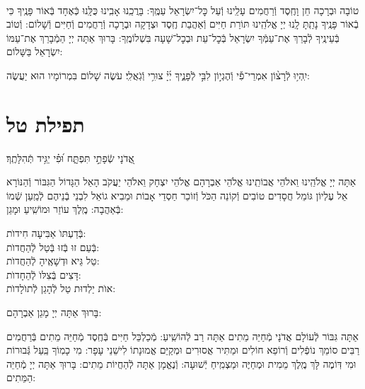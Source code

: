 \documentclass[twoside, openany, parskip=half, 11pt]{book}
\begin{document}
\begin{sometimes}
\shatz\\
 טוֹבָה וּבְרָכָה חֵן וָחֶֽסֶד וְֿרַחֲמִים עָלֵֽינוּ וְֿעַל כׇּל־יִשְׂרָאֵל עַמֶּֽךָ: בָּרֲכֵֽנוּ אָבִֽינוּ כֻּלָּֽנוּ כְּֿאֶחָד בְּֿאוֹר פָּנֶֽיךָ כִּי בְֿאוֹר פָּנֶֽיךָ נָתַֽתָּ לָֽנוּ יְיָ אֱלֹהֵֽינוּ תּוֹרַת חַיִּים וְֿאַהֲבַת חֶֽסֶד וּצְדָקָה וּבְרָכָה וְֿרַחֲמִים וְֿחַיִּים וְֿשָׁלוֹם: וְֿטוֹב בְּֿעֵינֶֽיךָ לְֿבָרֵךְ אֶת־עַמְּֿךָ יִשְׂרָאֵל בְּֿכׇל־עֵת וּבְכׇל־שָׁעָה בִּשְׁלוֹמֶֽךָ: בָּרוּךְ אַתָּה יְיָ הַמְֿבָרֵךְ אֶת־עַמּוֹ יִשְׂרָאֵל בַּשָּׁלוֹם:

 יִֽהְי֥וּ לְֿרָצ֨וֹן אִמְרֵי־פִ֡י וְֿהֶגְי֣וֹן לִבִּ֣י לְֿפָנֶ֑יךָ יְ֜יָ֗ צוּרִ֥י וְֿגֹֽאֲלִֽי׃ עֹשֶׂה שָׁלוֹם בִּמְרוֹמָיו הוּא יַעֲשֶׂה:

 \vfill


 \sepline

 \clearpage

\section[תפילת טל]{ תפילת טל }
\label{tefilastal}


 \begin{small}
אֲ֭דֹנָי שְֿׂפָתַ֣י תִּפְתָּ֑ח וּ֝פִ֗י יַגִּ֥יד תְּֿהִלָּתֶֽךָ׃
\\
\end{small}
 אַתָּה יְיָ אֱלֹהֵֽינוּ וֵאלֹהֵי אֲבוֹתֵֽינוּ אֱלֹהֵי אַבְרָהָם אֱלֹהֵי יִצְחָק וֵאלֹהֵי יַעֲקֹב הָאֵל הַגָּדוֹל הַגִּבּוֹר וְֿהַנּוֹרָא אֵל עֶלְיוֹן גּוֹמֵל חֲסָדִים טוֹבִים וְֿקוֹנֵה הַכֹּל וְֿזוֹכֵר חַסְדֵי אָבוֹת וּמֵבִיא גוֹאֵל לִבְנֵי בְֿנֵיהֶם לְֿמַֽעַן שְֿׁמוֹ בְּֿאַהֲבָה: מֶֽלֶךְ עוֹזֵר וּמוֹשִֽׁיעַ וּמָגֵן:


\begin{large}
 בְּֿדַעְתּוׂ אַבִּיעָה חִידוׂת: \\
בְּֿעַם זוּ בְּֿזוּ בְּֿטַל לְֿהַחֲדוׂת:\\
טַל גֵּיא וּדְשָׁאֶֽיהָ לְֿהַחֲדוׂת: \\
דָּצִים בְּֿצִלּוׂ לְֿהֵחָדוׂת:\\
אוׂת יַלְדוּת טַל לְֿהָגֵן לְֿתוׂלָדוׂת:

\end{large}


בָּרוּךְ אַתָּה יְיָ מָגֵן אַבְרָהָם:

אַתָּה גִּבּוֹר לְֿעוֹלָם אֲדֹנָי מְֿחַיֵּה מֵתִים אַתָּה רַב לְֿהוֹשִֽׁיעַ: מְֿכַלְכֵּל חַיִּים בְּֿחֶֽסֶד מְֿחַיֵּה מֵתִים בְּֿרַחֲמִים רַבִּים סוֹמֵךְ נוֹפְֿלִים וְֿרוֹפֵא חוֹלִים וּמַתִּיר אֲסוּרִים וּמְקַיֵּם אֱמוּנָתוֹ לִישֵׁנֵי עָפָר: מִי כָמֽוֹךָ בַּֽעַל גְּֿבוּרוֹת וּמִי דּֽוֹמֶה לָּךְ מֶֽלֶךְ מֵמִית וּמְחַיֶּה וּמַצְמִֽיחַ יְֿשׁוּעָה: וְֿנֶאֱמָן אַתָּה לְֿהַחֲיוֹת מֵתִים: בָּרוּךְ אַתָּה יְיָ מְֿחַיֵּה הַמֵּתִים:



\end{sometimes}
\end{document}
